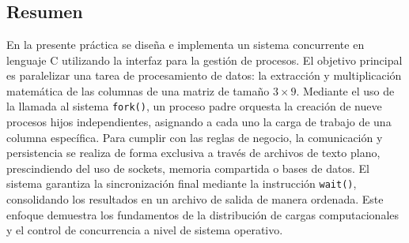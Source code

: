 %
%
%
%

\chapter{\TituloPracDos}
\label{prac:02}


\section{Resumen}
\label{sec:prac02:resumen}

En la presente práctica se diseña e implementa un sistema concurrente en lenguaje C utilizando la interfaz para la gestión de procesos. El objetivo principal es paralelizar una tarea de procesamiento de datos: la extracción y multiplicación matemática de las columnas de una matriz de tamaño $3 \times 9$. Mediante el uso de la llamada al sistema \texttt{fork()}, un proceso padre orquesta la creación de nueve procesos hijos independientes, asignando a cada uno la carga de trabajo de una columna específica. Para cumplir con las reglas de negocio, la comunicación y persistencia se realiza de forma exclusiva a través de archivos de texto plano, prescindiendo del uso de sockets, memoria compartida o bases de datos. El sistema garantiza la sincronización final mediante la instrucción \texttt{wait()}, consolidando los resultados en un archivo de salida de manera ordenada. Este enfoque demuestra los fundamentos de la distribución de cargas computacionales y el control de concurrencia a nivel de sistema operativo.


